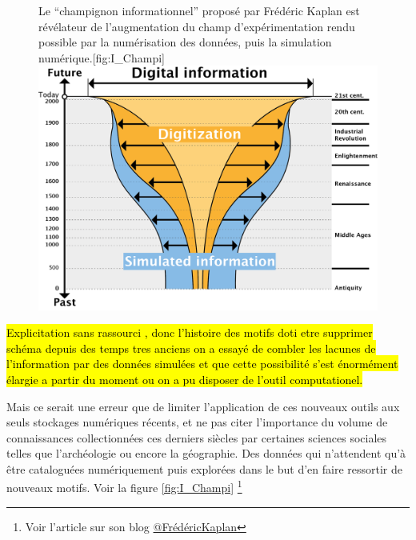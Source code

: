 \begin{figure}[!h]
\begin{sidecaption}[fortoc]{Le \enquote{champignon informationnel} proposé par Frédéric Kaplan est révélateur de l'augmentation du champ d'expérimentation rendu possible par la numérisation des données, puis la simulation numérique.}[fig:I_Champi]
 \centering
 \includegraphics[width=\linewidth]{champignonKaplan.png}
  \end{sidecaption}
\end{figure}


\hl{Explicitation sans rassourci , donc l'histoire des motifs doti etre supprimer
schéma depuis des temps tres anciens on a essayé de combler les lacunes de l'information par des données simulées et que cette possibilité s'est énormément élargie a partir du moment ou on a pu disposer de l'outil computationel.}

Mais ce serait une erreur que de limiter l'application de ces nouveaux outils aux seuls stockages numériques récents, et ne pas citer l'importance du volume de connaissances collectionnées ces derniers siècles par certaines sciences sociales telles que l'archéologie ou encore la géographie. Des données qui n'attendent qu'à être cataloguées numériquement puis explorées dans le but d'en faire ressortir de nouveaux motifs. Voir la figure \ref{fig:I_Champi} \footnote{Voir l'article sur son blog \href{http://fkaplan.wordpress.com/2013/03/14/lancement-de-la-venice-time-machine/}{@FrédéricKaplan}}


